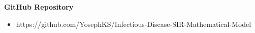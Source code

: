 \documentclass{article}
\begin{document}
\begin{flushleft}
    
\end{flushleft}

\begin{flushleft}
    
\end{flushleft}

\begin{flushleft}
    \textbf{GitHub Repository}
    
    \begin{itemize}
        \item https://github.com/YosephKS/Infectious-Disease-SIR-Mathematical-Model
    \end{itemize}
\end{flushleft}
\end{document}
